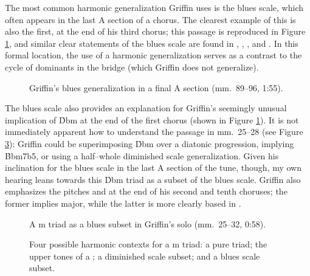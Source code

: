 The most common harmonic generalization Griffin uses is the \Bflat blues
scale, which often appears in the last A section of a chorus. The clearest
example of this is also the first, at the end of his third chorus; this
passage is reproduced in Figure \ref{ran:jg-blues-gen}, and similar clear
statements of the blues scale are found in , ,
, and . In this formal location, the use of a harmonic
generalization serves as a contrast to the cycle of dominants in the bridge
(which Griffin does not generalize).

\begin{figure}[tbp]
  \caption[Griffin's blues generalization in a final A section.]{%
    Griffin's blues generalization in a final A section (mm.~89--96, 1:55).}
  \label{ran:jg-blues-gen}
\end{figure}

The blues scale also provides an explanation for Griffin's seemingly unusual
implication of \h{Dbm} at the end of the first chorus (shown in Figure
\ref{ran:jg-blues-gen}). It is not immediately apparent how to understand the
passage in mm.~25--28 (see Figure \ref{ran:dflat-possibilities}): Griffin
could be superimposing \h{Dbm} over a \Bflat diatonic progression, implying
\h{Bbm7b5}, or using a \Bflat half--whole diminished scale generalization.
Given his inclination for the blues scale in the last A section of the tune,
though, my own hearing leans towards this \h{Dbm} triad as a subset of the
\Bflat blues scale. Griffin also emphasizes the pitches \Dflat and \Aflat at
the end of his second and tenth choruses; the former implies \Dflat
major, while the latter is more clearly based in \Bflat.

\begin{figure}[tbp]
  \caption[A \protect\h{Dbm} triad as a \protect\h{Bb} blues subset in
  Griffin's solo.]{%
    A \Dflat{}m triad as a \Bflat blues subset in Griffin's solo (mm.~25--32, 0:58).}
  \label{ran:jg-blues-subset}
\end{figure}

\begin{figure}[tbp]
  \caption[Four possible harmonic contexts for a \Dflat{}m triad.]{%
    Four possible harmonic contexts for a \Dflat{}m triad: a pure triad; the
    upper tones of a \protect{}; a diminished scale subset; and a
    blues scale subset.}
  \label{ran:dflat-possibilities}
\end{figure}

